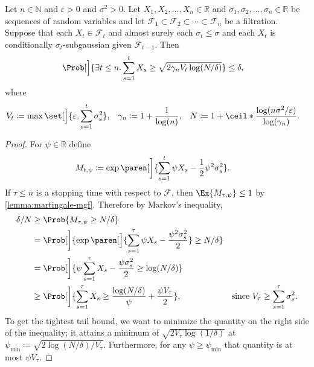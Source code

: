 \documentclass{article}
\newcommand{\defeq}{\coloneq}
\newcommand{\Real}{\mathds{R}}
\newcommand{\Nat}{\mathds{N}}
\DeclarePairedDelimiter{\paren}()
\DeclarePairedDelimiter{\ceil}\lceil\rceil
\begin{document}
\begin{lemma}
  Let $n\in\Nat$ and $\varepsilon>0$ and $\sigma^2>0$.  Let
  $X_1,X_2,\dotsc,X_n\in\Real$ and
  $\sigma_1,\sigma_2,\dotsc,\sigma_n\in\Real$ be sequences of random
  variables and let
  $\mathcal{F}_1 \subset \mathcal{F}_2 \subset \dotsb \subset
  \mathcal{F}_n$ be a filtration.  Suppose that each
  $X_t\in\mathcal{F}_t$ and almost surely each $\sigma_t \le \sigma$
  and each $X_t$ is conditionally $\sigma_t$-subgaussian given
  $\mathcal{F}_{t-1}$.  Then
  \begin{align*}
    \Prob[\Big]{\exists t \le n. \sum_{s=1}^t X_s \ge
    \sqrt{2\gamma_nV_t\log(N/\delta)}}
    &\le \delta,
  \end{align*}
  where
  \begin{align*}
    V_t &\defeq \max\set[\Big]{\varepsilon,\sum_{s=1}^t \sigma_s^2}, &
    \gamma_n &\defeq 1 + \frac{1}{\log(n)}, &
    N &\defeq 1 + \ceil*{\frac{\log(n\sigma^2/\varepsilon)}{\log(\gamma_n)}}.
  \end{align*}

  \begin{proof}
    For $\psi\in\Real$ define
    \begin{align*}
      M_{t,\psi} &\defeq \exp\paren[\bigg]{\sum_{s=1}^t \psi X_s - \frac{1}{2}\psi^2\sigma_s^2}.
    \end{align*}
    If $\tau \le n$ is a stopping time with respect to $\mathcal{F}$,
    then $\Ex{M_{\tau,\psi}} \le 1$ by \cref{lemma:martingale-mgf}.
    Therefore by Markov's inequality,
    \begin{align*}
      \delta/N
      &\ge \Prob{M_{\tau,\psi} \ge N/\delta} \\
      &= \Prob[\bigg]{\exp\paren[\Big]{\sum_{s=1}^\tau \psi X_s - \frac{\psi^2\sigma_s^2}{2}} \ge N/\delta} \\
      &= \Prob[\bigg]{\psi \sum_{s=1}^\tau X_s - \frac{\psi\sigma_s^2}{2} \ge \log(N/\delta)} \\
      &\ge \Prob[\bigg]{\sum_{s=1}^\tau X_s \ge \frac{\log(N/\delta)}{\psi} + \frac{\psi V_\tau}{2}},
      &\text{since } V_\tau \ge \sum_{s=1}^\tau \sigma_s^2.
    \end{align*}
    To get the tightest tail bound, we want to minimize the quantity
    on the right side of the inequality; it attains a minimum of
    $\sqrt{2V_\tau \log(1/\delta)}$ at
    $\psi_{\min} \defeq \sqrt{2\log(N/\delta)/V_\tau}$.  Furthermore,
    for any $\psi\ge\psi_{\min}$ that quantity is at most
    $\psi V_\tau$.


\end{proof}
\end{lemma}
\end{document}
